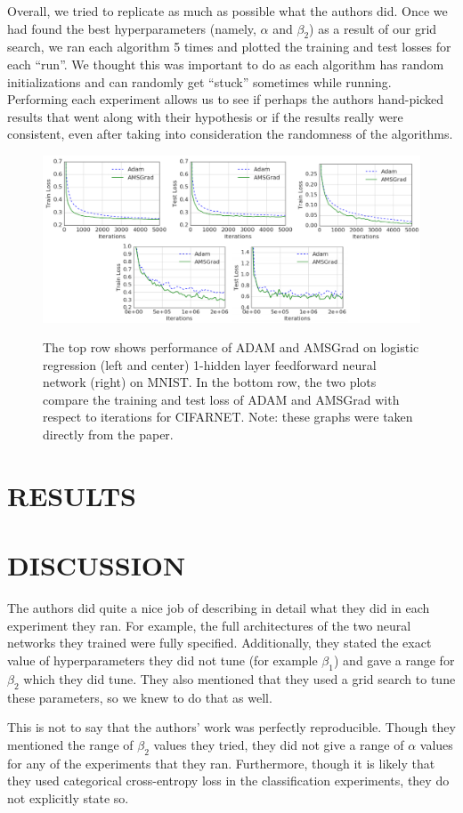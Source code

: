 \documentclass[letterpaper, 10 pt, conference]{ieeeconf}  %
\begin{document}
Overall, we tried to replicate as much as possible what the authors did. Once we had found the best hyperparameters (namely, $\alpha$ and $\beta_{2}$) as a result of our grid search, we ran each algorithm 5 times and plotted the training and test losses for each ``run''. We thought this was important to do as each algorithm has random initializations and can randomly get ``stuck'' sometimes while running. Performing each experiment allows us to see if perhaps the authors hand-picked results that went along with their hypothesis or if the results really were consistent, even after taking into consideration the randomness of the algorithms. 
    
\begin{figure}[]
\centering
\begin{minipage}{0.9\textwidth}
  \centering
  \includegraphics[width=1\linewidth]{OG_results_nets.png}
  \label{fig:test2}
\end{minipage}%
\caption[]{The top row shows performance of ADAM and AMSGrad on logistic regression (left and center) 1-hidden layer feedforward neural network (right) on MNIST. In the bottom row, the two plots compare the training and test loss of ADAM and AMSGrad with respect to iterations for CIFARNET. Note: these graphs were taken directly from the paper.} 
\end{figure}    
    
\section{RESULTS}

\section{DISCUSSION}
The authors did quite a nice job of describing in detail what they did in each experiment they ran. For example, the full architectures of the two neural networks they trained were fully specified. Additionally, they stated the exact value of hyperparameters they did not tune (for example $\beta_{1}$) and gave a range for $\beta_{2}$ which they did tune. They also mentioned that they used a grid search to tune these parameters, so we knew to do that as well. \par
This is not to say that the authors' work was perfectly reproducible. Though they mentioned the range of $\beta_{2}$ values they tried, they did not give a range of $\alpha$ values for any of the experiments that they ran. Furthermore, though it is likely that they used categorical cross-entropy loss in the classification experiments, they do not explicitly state so. 
\end{document}
